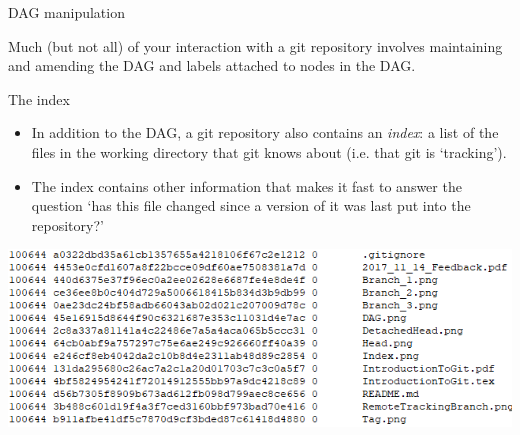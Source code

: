 \documentclass[usenames,dvipsnames]{beamer}
\begin{document}
\begin{frame}{DAG manipulation}
  \begin{block}{}
      Much (but not all) of your interaction with a git repository involves maintaining and amending the DAG and labels attached to nodes in the DAG.
  \end{block}
\end{frame}


\begin{frame}{The index}
  \begin{block}{}
    \begin{itemize}
      \item{In addition to the DAG, a git repository also contains an \textit{index}: a list of the files in the working directory that git knows about (i.e. that git is `tracking').}
      \item{The index contains other information that makes it fast to answer the question `has this file changed since a version of it was last put into the repository?'}
    \end{itemize}
    \begin{center}
      \includegraphics[scale=0.55]{Index.png}
    \end{center}
  \end{block}
\end{frame}
\end{document}
